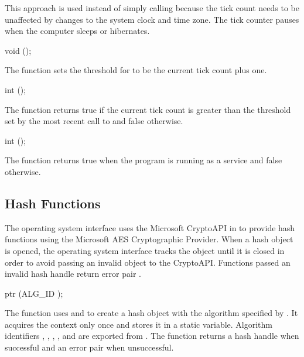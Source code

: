This approach is used instead of simply calling
 because the tick count needs to be
unaffected by changes to the system clock and time zone.  The tick
counter pauses when the computer sleeps or hibernates.

\begin{function}
  void ();
\end{function}\antipar

The  function sets the threshold for
 to be the current tick count plus one.

\begin{function}
  int ();
\end{function}\antipar

The  function returns true if the current tick
count is greater than the threshold set by the most recent call to
 and false otherwise.

\begin{function}
  int ();
\end{function}\antipar

The  function returns true when the program is
running as a service and false otherwise.

\subsection {Hash Functions}

The operating system interface uses the Microsoft CryptoAPI in
 to provide hash functions using the Microsoft AES
Cryptographic Provider. When a hash object is opened, the operating
system interface tracks the object until it is closed in order to
avoid passing an invalid object to the CryptoAPI. Functions passed an
invalid hash handle return error pair .

\begin{function}
  ptr (ALG\_ID );
\end{function}\antipar

The  function uses  and
 to create a hash object with the algorithm
specified by . It acquires the context only once and stores
it in a static variable. Algorithm identifiers ,
, , , and
 are exported from . The
function returns a hash handle when successful and an error pair when
unsuccessful.

